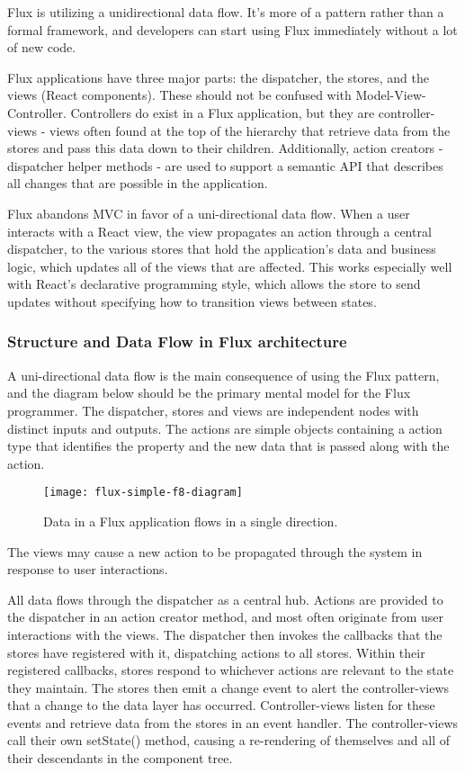 Flux is utilizing a unidirectional data flow. It's more of a pattern rather than a formal framework, and developers can start using Flux immediately without a lot of new code.

Flux applications have three major parts: the dispatcher, the stores, and the views (React components). These should not be confused with Model-View-Controller. Controllers do exist in a Flux application, but they are controller-views - views often found at the top of the hierarchy that retrieve data from the stores and pass this data down to their children. Additionally, action creators - dispatcher helper methods - are used to support a semantic API that describes all changes that are possible in the application.

Flux abandons MVC in favor of a uni-directional data flow. When a user interacts with a React view, the view propagates an action through a central dispatcher, to the various stores that hold the application's data and business logic, which updates all of the views that are affected. This works especially well with React's declarative programming style, which allows the store to send updates without specifying how to transition views between states.\citep{flux}

\subsubsection{Structure and Data Flow in Flux architecture}
A uni-directional data flow is the main consequence of using the Flux pattern, and the diagram below should be the primary mental model for the Flux programmer. The dispatcher, stores and views are independent nodes with distinct inputs and outputs. The actions are simple objects containing a action type that identifies the property and the new data that is passed along with the action.\citep{flux}

\begin{figure}[ht!]
\centering
\texttt{[image: flux-simple-f8-diagram]}
\caption{Data in a Flux application flows in a single direction.}
\label{r:42}
\end{figure}

The views may cause a new action to be propagated through the system in response to user interactions.

All data flows through the dispatcher as a central hub. Actions are provided to the dispatcher in an action creator method, and most often originate from user interactions with the views. The dispatcher then invokes the callbacks that the stores have registered with it, dispatching actions to all stores. Within their registered callbacks, stores respond to whichever actions are relevant to the state they maintain. The stores then emit a change event to alert the controller-views that a change to the data layer has occurred. Controller-views listen for these events and retrieve data from the stores in an event handler. The controller-views call their own setState() method, causing a re-rendering of themselves and all of their descendants in the component tree.

